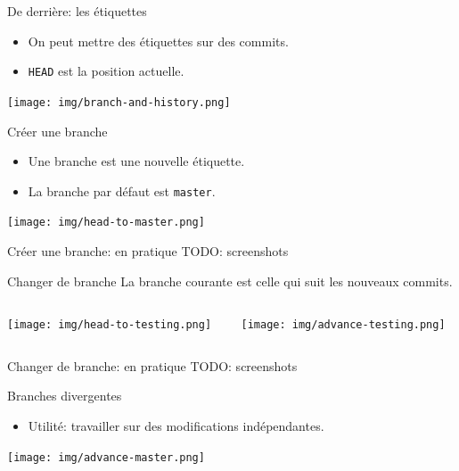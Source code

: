 \documentclass{beamer}
\begin{document}
\begin{frame}{De derrière: les étiquettes}
    \begin{itemize}
        \item On peut mettre des étiquettes sur des commits.
        \item \texttt{HEAD} est la position actuelle.
    \end{itemize}
    \texttt{[image: img/branch-and-history.png]}
\end{frame}

\begin{frame}{Créer une branche}
    \begin{itemize}
        \item Une branche est une nouvelle étiquette.
        \item La branche par défaut est \texttt{master}.
    \end{itemize}
    \begin{center}
        \texttt{[image: img/head-to-master.png]}
    \end{center}
\end{frame}

\begin{frame}{Créer une branche: en pratique}
    TODO: screenshots
\end{frame}

\begin{frame}{Changer de branche}
    La branche courante est celle qui suit les nouveaux commits.
    \begin{columns}
        \begin{column}{0.44\textwidth}
            \begin{center}
                \texttt{[image: img/head-to-testing.png]}
            \end{center}
        \end{column}
        \begin{column}{0.54\textwidth}
            \texttt{[image: img/advance-testing.png]}
        \end{column}
    \end{columns}
\end{frame}

\begin{frame}{Changer de branche: en pratique}
    TODO: screenshots
\end{frame}

\begin{frame}{Branches divergentes}
    \begin{itemize}
        \item Utilité: travailler sur des modifications indépendantes.
    \end{itemize}
    \begin{center}
        \texttt{[image: img/advance-master.png]}
    \end{center}
\end{frame}
\end{document}
